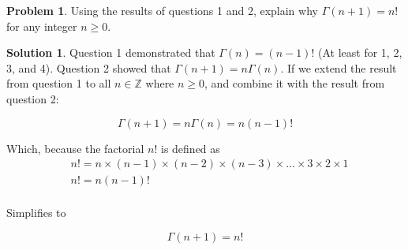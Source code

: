 \documentclass[10pt]{article}
\theoremstyle{definition}
\newtheorem{problem}{Problem}
\newtheorem{soln}{Solution}
\begin{document}
\begin{problem}
Using the results of questions 1 and 2, explain why $\Gamma(n + 1) = n!$ for any integer $n \geq 0$.
\end{problem}
\begin{soln}
    Question 1 demonstrated that $\Gamma(n)=(n-1)!$ (At least for 1, 2, 3, and 4). Question 2 showed that $\Gamma(n+1)=n\Gamma(n)$. If we extend the result from question 1 to all $n\in \mathbb{Z}$ where $n\geq 0$,
    and combine it with the result from question 2:

    $$\Gamma(n+1)=n\Gamma(n)=n(n-1)!$$

    \noindent Which, because the factorial $n!$ is defined as
    \begin{align*}
         & n! = n\times (n-1) \times (n-2) \times (n-3) \times \dots \times 3 \times 2 \times 1 \\
         & n! = n(n-1)!                                                                         \\
    \end{align*}

    \noindent Simplifies to

    $$\Gamma(n+1)=n!$$
\end{soln}
\end{document}
